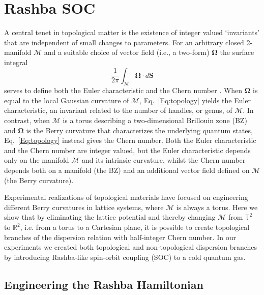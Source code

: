 \section{Rashba SOC}

A central tenet in topological matter is the existence of integer valued `invariants' that are independent of small changes to parameters. For an arbitrary closed 2-manifold $\mathcal{M}$ and a suitable choice of vector field (i.e., a two-form) $\mathbf{\Omega}$ the surface integral
%
\begin{equation}
	\frac{1}{2\pi}\int_{\mathcal{M}}\mathbf \Omega\cdot d\mathbf S
	\label{Eq:topology}
\end{equation}
%
serves to define both the Euler characteristic and the Chern number \cite{ozawa_topological_2019,cooper_topological_2019}. When $\mathbf{\Omega}$ is equal to the local Gaussian curvature of $\mathcal{M}$, Eq.~\ref{Eq:topology} yields the Euler characteristic, an invariant related to the number of handles, or genus, of $\mathcal{M}$. In contrast, when $\mathcal{M}$ is a torus describing a two-dimensional Brillouin zone (BZ) and $\mathbf{\Omega}$ is the Berry curvature that characterizes the underlying quantum states, Eq.~\ref{Eq:topology} instead gives the Chern number. Both the Euler characteristic and the Chern number are integer valued, but the Euler characteristic depends only on the manifold $\mathcal{M}$ and its intrinsic curvature, whilst the Chern number depends both on a manifold (the BZ) and an additional vector field defined on $\mathcal{M}$ (the Berry curvature). 


Experimental realizations of topological materials have focused on engineering different Berry curvatures in lattice systems, where $\mathcal{M}$ is always a torus. Here we show that by eliminating the lattice potential and thereby changing  $\mathcal{M}$ from ${\mathbb T}^2$ to ${\mathbb R}^2$, i.e. from a torus to a Cartesian plane, it is possible to create topological branches of the dispersion relation with half-integer Chern number. In our experiments we created both topological and non-topological dispersion branches by introducing Rashba-like spin-orbit coupling (SOC)\cite{campbell_realistic_2011, huang_experimental_2016, meng_experimental_2016} to a cold quantum gas. 

\subsection{Engineering the Rashba Hamiltonian}

